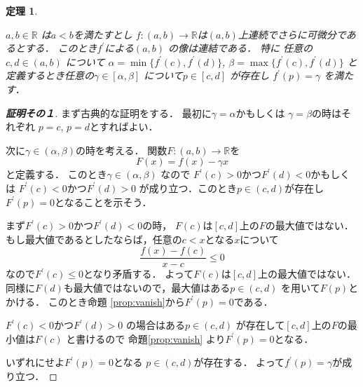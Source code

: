 \documentclass[leqno, a4paper, 12pt]{jsarticle}
\newtheorem{thm}{定理}
\newcommand{\rr}{\mathbb{R}}
\newcommand{\bibun}[1]{#1^{\prime}}
\begin{document}
\begin{thm}\label{thm:darboux}

$a, b\in \rr$
は$a<b$を満たすとし
$f: (a, b)\to \rr$は$(a, b)$上連続でさらに可微分であるとする．
このとき$\bibun{f}$による$(a, b)$
の像は連結である．
特に
任意の$c, d\in (a, b)$
について
$\alpha=\min\{\bibun{f}(c), \bibun{f}(d)\}$, 
$\beta=\max\{\bibun{f}(c), \bibun{f}(d)\}$
と定義するとき任意の$\gamma\in [\alpha, \beta]$
について$p\in [c, d]$
が存在し
$\bibun{f}(p)=\gamma$
を満たす．

\end{thm}
\begin{proof}[\textbf{証明その１}]
まず古典的な証明をする．
最初に$\gamma=\alpha$かもしくは
$\gamma=\beta$の時はそれぞれ
$p=c$, $p=d$とすればよい．

次に$\gamma\in (\alpha, \beta)$の時を考える．
関数$F: (a, b)\to \rr$を
\[
F(x)=f(x)-\gamma x
\]
と定義する．
このとき$\gamma\in (\alpha, \beta)$
なので
$\bibun{F}(c)>0$かつ$\bibun{F}(d)<0$かもしくは
$\bibun{F}(c)<0$かつ$\bibun{F}(d)>0$
が成り立つ．このとき$p\in (c, d)$が存在し
$\bibun{F}(p)=0$となることを示そう．

まず$\bibun{F}(c)>0$かつ$\bibun{F}(d)<0$の時，
$F(c)$は$[c, d]$上の$F$の最大値ではない．
もし最大値であるとしたならば，任意の$c<x$となる$x$について
\[
\frac{f(x)-f(c)}{x-c}\le 0
\]
なので$\bibun{F}(c)\le 0$となり矛盾する．
よって$F(c)$は$[c, d]$上の最大値ではない．
同様に$F(d)$も最大値ではないので，最大値はある$p\in (c, d)$
を用いて$F(p)$とかける．
このとき命題 \ref{prop:vanish}から$\bibun{F}(p)=0$である．

$\bibun{F}(c)<0$かつ$\bibun{F}(d)>0$
の場合はある$p\in (c, d)$
が存在して$[c, d]$上の$F$の最小値は$F(c)$
と書けるので
命題\ref{prop:vanish}
より$\bibun{F}(p)=0$となる．

いずれにせよ$\bibun{F}(p)=0$となる
$p\in (c, d)$が存在する．
よって$\bibun{f}(p)=\gamma$が成り立つ．
\end{proof}
\end{document}
